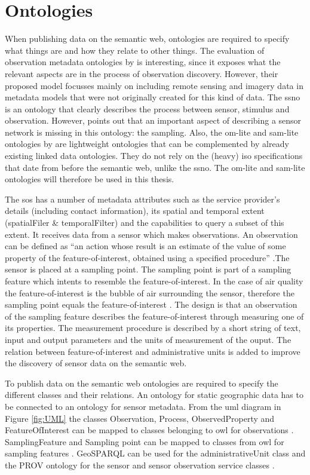 \section{Ontologies}
When publishing data on the semantic web, ontologies are required to specify what things are and how they relate to other things. The evaluation of observation metadata ontologies by \cite{SW:Hu} is interesting, since it exposes what the relevant aspects are in the process of observation discovery. However, their proposed model focusses mainly on including remote sensing and imagery data in metadata models that were not originally created for this kind of data. The \ac{ssno} is an ontology that clearly describes the process between sensor, stimulus and observation. However, \cite{SSW:Cox4} points out that an important aspect of describing a sensor network is missing in this ontology: the sampling. Also, the om-lite and sam-lite ontologies by \cite{SSW:Cox4} are lightweight ontologies that can be complemented by already existing linked data ontologies. They do not rely on the (heavy) \ac{iso} specifications that date from before the semantic web, unlike the \ac{ssno}. The om-lite and sam-lite ontologies will therefore be used in this thesis. 

The \ac{sos} has a number of metadata attributes such as the service provider's details (including contact information), its spatial and temporal extent (spatialFiler \& temporalFilter) and the capabilities to query a subset of this extent. It receives data from a sensor which makes observations. An observation can be defined as \enquote{an action whose result is an estimate of the value of some property of the feature-of-interest, obtained using a specified procedure} \citep{SSW:Cox3}.The sensor is placed at a sampling point. The sampling point is part of a sampling feature which intents to resemble the feature-of-interest. In the case of air quality the feature-of-interest is the bubble of air surrounding the sensor, therefore the sampling point equals the feature-of-interest \citep{SDI:INSPIRE2}. The design is that an observation of the sampling feature describes the  feature-of-interest through measuring one of its properties. The measurement procedure is described by a short string of text, input and output parameters and the units of measurement of the ouput. The relation between feature-of-interest and administrative units is added to improve the discovery of sensor data on the semantic web. 

To publish data on the semantic web ontologies are required to specify the different classes and their relations. An ontology for static geographic data has to be connected to an ontology for sensor metadata. From the \ac{uml} diagram in Figure \ref{fig:UML} the classes Observation, Process, ObservedProperty and FeatureOfInterest can be mapped to classes belonging to \ac{owl} for observations \citep{SSW:Cox}. SamplingFeature and Sampling point can be mapped to classes from \ac{owl} for sampling features \citep{SSW:Cox2}. GeoSPARQL can be used for the administrativeUnit class \citep{LD:OGC} and the PROV ontology for the sensor and sensor observation service classes \citep{LD:W3C2}. 


